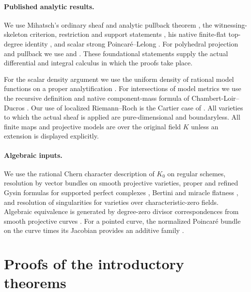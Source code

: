 \documentclass[11pt,reqno]{amsart}
\theoremstyle{definition}
\theoremstyle{remark}
\numberwithin{equation}{section}
\begin{document}
\paragraph{Published analytic results.}
We use Mihatsch's ordinary sheaf and analytic pullback theorem
\cite[Definition~4.2 and Theorem~4.5]{M}, the witnessing-skeleton
criterion, restriction and support statements
\cite[Lemma~4.4, Corollary~4.9 and Proposition~4.11]{M},
his native finite-flat top-degree identity
\cite[Lemma~3.15 and Definition~4.10]{M}, and scalar strong
Poincar\'e--Lelong \cite[Theorem~5.5 and Corollary~5.6]{M}.
For polyhedral projection and pullback we use
\cite[Section~2 and Proposition/Definition~4.2]{MTrop} and
\cite[Proposition~2.38 and Definition~2.41]{M}.
These foundational statements supply the actual differential and
integral calculus in which the proofs take place.

For the scalar density argument we use the uniform density of
rational model functions on a proper analytification
\cite[Proposition~2.15]{GM}.  For intersections of model metrics
we use the recursive definition and native component-mass formula
of Chambert-Loir--Ducros
\cite[Sections~8.7--8.8 and Theorem~18.5.5]{CLD}.
Our use of localized Riemann--Roch is the Cartier case of
\cite[Corollary~18.1.2]{Fulton}.
All varieties to which the actual sheaf is applied are
pure-dimensional and boundaryless.  All finite maps and
projective models are over the original field $K$ unless an
extension is displayed explicitly.

\paragraph{Algebraic inputs.}
We use the rational Chern character description of $K_0$ on
regular schemes, resolution by vector bundles on smooth projective
varieties, proper and refined Gysin formulas for supported
perfect complexes \cite{Stacks}, Bertini and miracle flatness
\cite{Stacks}, and resolution of singularities for varieties
over characteristic-zero fields.  Algebraic equivalence is
generated by degree-zero divisor correspondences from smooth
projective curves \cite{ACMV}.  For a pointed curve, the
normalized Poincar\'e bundle on the curve times its Jacobian
provides an additive family \cite{MilneJV}.








\section{Proofs of the introductory theorems}
\end{document}
